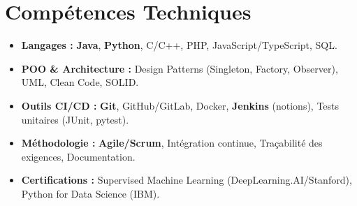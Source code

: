 \documentclass[a4paper,11pt]{article}
\begin{document}
\section{Compétences Techniques}
\begin{itemize}[leftmargin=*, nosep]
    \item \small{\textbf{Langages :} \textbf{Java}, \textbf{Python}, C/C++, PHP, JavaScript/TypeScript, SQL.}
    \item \small{\textbf{POO \& Architecture :} Design Patterns (Singleton, Factory, Observer), UML, Clean Code, SOLID.}
    \item \small{\textbf{Outils CI/CD :} \textbf{Git}, GitHub/GitLab, Docker, \textbf{Jenkins} (notions), Tests unitaires (JUnit, pytest).}
    \item \small{\textbf{Méthodologie :} \textbf{Agile/Scrum}, Intégration continue, Traçabilité des exigences, Documentation.}
    \item \small{\textbf{Certifications :} Supervised Machine Learning (DeepLearning.AI/Stanford), Python for Data Science (IBM).}
\end{itemize}

\end{document}
